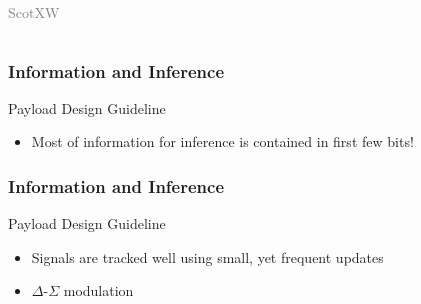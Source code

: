\documentclass[10pt]{beamer}
\begin{document}
\begin{frame}
\begin{columns}
\begin{center}
  {\tiny \textcolor{gray}{\textcopyright ScotXW}}
  \end{center}
\end{columns}
\end{frame}


\begin{frame}
\frametitle{Information and Inference}
\begin{center}
\end{center}
\vfill
\begin{block}{Payload Design Guideline}
  \begin{itemize}
  \item Most of information for inference is contained in first few bits!
  \end{itemize}
\end{block}
\end{frame}


\begin{frame}
\frametitle{Information and Inference}
\begin{center}
\end{center}
\vfill
\begin{block}{Payload Design Guideline}
  \begin{itemize}
  \item Signals are tracked well using small, yet frequent updates
  \item $\Delta$-$\Sigma$ modulation
  \end{itemize}
\end{block}
\end{frame}
\end{document}
